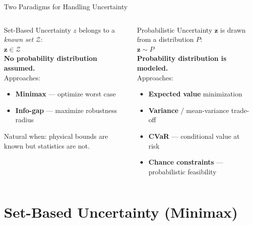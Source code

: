\documentclass[aspectratio=169,10pt]{beamer}
\newcommand{\z}{\mathbf{z}}
\newcommand{\Z}{\mathcal{Z}}
\begin{document}
\begin{frame}{Two Paradigms for Handling Uncertainty}
  \begin{columns}
      \begin{alertblock}{Set-Based Uncertainty}
        $z$ belongs to a \emph{known set} $\Z$:\\[4pt]
        $\z \in \Z$\\[4pt]
        \textbf{No probability distribution assumed.}\\[4pt]
        Approaches:
        \begin{itemize}
          \item \textbf{Minimax} — optimize worst case
          \item \textbf{Info-gap} — maximize robustness radius
        \end{itemize}
        Natural when: physical bounds are known but
        statistics are not.
      \end{alertblock}
      \begin{block}{Probabilistic Uncertainty}
        $\z$ is drawn from a distribution $P$:\\[4pt]
        $\z \sim P$\\[4pt]
        \textbf{Probability distribution is modeled.}\\[4pt]
        Approaches:
        \begin{itemize}
          \item \textbf{Expected value} minimization
          \item \textbf{Variance} / mean-variance trade-off
          \item \textbf{CVaR} — conditional value at risk
          \item \textbf{Chance constraints} — probabilistic feasibility
        \end{itemize}
      \end{block}
  \end{columns}
\end{frame}

\section{Set-Based Uncertainty (Minimax)}
\end{document}
